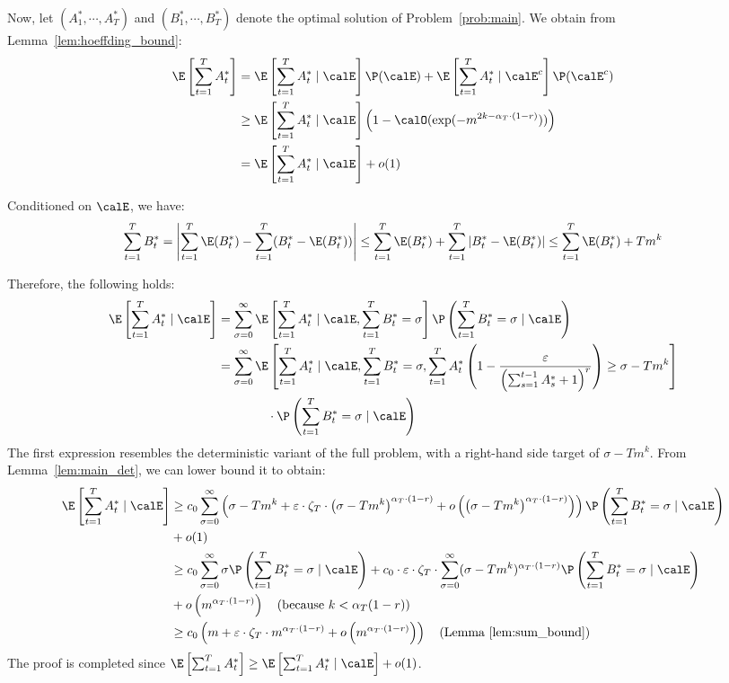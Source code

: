 \documentclass[blindrev]{informs3noheader}
\begin{document}
Now, let $(A^*_1,\cdots,A^*_T)$ and $(B^*_1,\cdots,B^*_T)$ denote the optimal solution of Problem~\eqref{prob:main}. We obtain from Lemma~\ref{lem:hoeffding_bound}:
\begin{align*}
\E\left[\sum_{t=1}^T A^*_t\right]
&=\E\left[\sum_{t=1}^T A^*_t \mid \calE\right]\P(\calE)+\E\left[\sum_{t=1}^T A^*_t \mid \calE^c\right]\P(\calE^c)\\
&\geq \E\left[\sum_{t=1}^T A^*_t \mid \calE\right]\left(1-\calO(\exp(-m^{2k-\alpha_T\cdot(1-r)}))\right)\\
&=\E\left[\sum_{t=1}^T A^*_t \mid \calE\right] + o(1)
\end{align*}

Conditioned on $\calE$, we have:
$$\sum_{t=1}^T B^*_t=\left|\sum_{t=1}^T \E(B^*_t)-\sum_{t=1}^T (B^*_t-\E(B^*_t))\right|\leq\sum_{t=1}^T \E(B^*_t)+\sum_{t=1}^T |B^*_t-\E(B^*_t)|\leq\sum_{t=1}^T \E(B^*_t)+Tm^k$$

Therefore, the following holds:
\begin{align*}
\E\left[\sum_{t=1}^T A^*_t\mid \calE\right]
&=\sum_{\sigma=0}^\infty \E\left[\sum_{t=1}^T A^*_t \mid \calE, \sum_{t=1}^T B^*_t=\sigma\right]\P\left(\sum_{t=1}^T B^*_t=\sigma \mid \calE \right)\\
&=\sum_{\sigma=0}^\infty\E\left[\sum_{t=1}^T A^*_t \mid \calE, \sum_{t=1}^T B^*_t=\sigma, \sum_{t=1}^T A^*_t \left(1- \frac{\varepsilon}{\left(\sum_{s=1}^{t-1} A^*_s +1\right)^r}\right)\geq \sigma-Tm^k\right]\\&\qquad\qquad\cdot\P\left(\sum_{t=1}^T B^*_t=\sigma\mid \calE \right)
\end{align*}
The first expression resembles the deterministic variant of the full problem, with a right-hand side target of $\sigma-Tm^k$. From Lemma~\ref{lem:main_det}, we can lower bound it to obtain:
\begin{align*}
\E\left[\sum_{t=1}^T A^*_t\mid \calE\right]
&\geq c_0\sum_{\sigma=0}^\infty\left(\sigma-Tm^k+\varepsilon\cdot\zeta_T\cdot \left(\sigma-Tm^k\right)^{\alpha_T\cdot(1-r)}+ o\left(\left(\sigma-Tm^k\right)^{\alpha_T\cdot(1-r)}\right)\right)\P\left(\sum_{t=1}^T B^*_t=\sigma\mid \calE\right)\\
&+ o(1)\\
&\geq c_0\sum_{\sigma=0}^\infty\sigma\P\left(\sum_{t=1}^T B^*_t=\sigma\mid \calE\right)+c_0\cdot\varepsilon\cdot\zeta_T\cdot\sum_{\sigma=0}^\infty(\sigma-Tm^k)^{\alpha_T\cdot(1-r)}\P\left(\sum_{t=1}^T B^*_t=\sigma\mid \calE\right)\\
&+ o\left(m^{\alpha_T\cdot(1-r)}\right)\quad\text{(because $k<\alpha_T(1-r)$)}\\
&\geq c_0\left( m+\varepsilon\cdot \zeta_T \cdot m^{\alpha_T\cdot(1-r)} +  o\left(m^{\alpha_T\cdot(1-r)}\right)\right)
\quad\text{(Lemma~\ref{lem:sum_bound})}
\end{align*}
The proof is completed since $\E\left[\sum_{t=1}^T A^*_t\right]\geq\E\left[\sum_{t=1}^T A^*_t \mid \calE\right] + o(1)$. 
\end{document}
